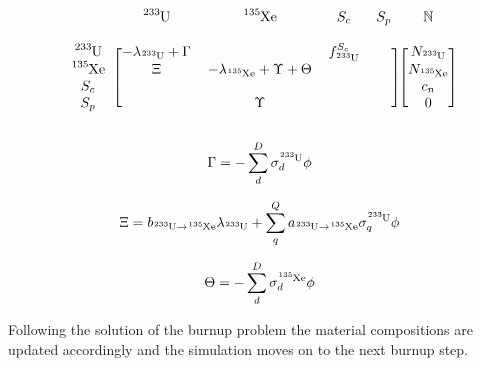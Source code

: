     \begin{equation}
    \label{fig:burn_matrix}
        \begin{blockarray}{cccccc}
             &
            \ce{^{233}U} &
            \ce{^{135}Xe} &
            S_{c} &
            S_{p} &
            \mathbb{N} \\
             &
             &
             &
             &
             &
             \\ 
        \begin{block}{c[cccc][c]}
            \ce{^{233}U} &
            -\lambda_{\ce{^{233}U}} + \Gamma &
             &
            f^{S_{c}}_{\ce{^{233}U}} &
             &
            N_{\ce{^{233}U}} \\
            \ce{^{135}Xe} &
            \Xi &
            -\lambda_{\ce{^{135}Xe}} + \Upsilon + \Theta &
             &
             &
            N_{\ce{^{135}Xe}} \\
            S_{c} &
             &
             &
             &
             &
            c_{n}\\
            S_{p} &
             &
             \Upsilon &
             &
             &
             0\\
        \end{block}
        \end{blockarray}
    \end{equation}

\begin{equation}
\label{eq:Gamma_def}
\Gamma = - \sum \limits_{d}^{D} \sigma_{d}^{\ce{^{233}U}} \phi
\end{equation}

\begin{equation}
\label{eq:Xi_def}
\Xi = b_{\ce{^{233}U} \rightarrow \ce{^{135}Xe}} \lambda_{\ce{^{233}U}} + \sum
\limits_{q}^{Q} a_{\ce{^{233}U} \rightarrow \ce{^{135}Xe}} \sigma_{q}^{
\ce{^{233}U}} \phi
\end{equation}

\begin{equation}
\label{eq:Theta_def}
\Theta =-\sum \limits_{d}^{D} \sigma_{d}^{\ce{^{135}Xe}} \phi
\end{equation}

Following the solution of the burnup problem the material compositions are
updated accordingly and the simulation moves on to the next burnup step.

